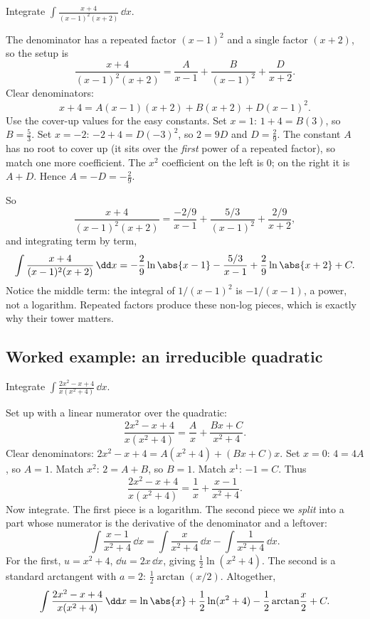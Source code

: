 \begin{example}
\label{ch24:ex-repeated}
Integrate $\displaystyle \int \frac{x + 4}{(x-1)^2(x+2)}\,\dd x.$
\end{example}

The denominator has a repeated factor $(x-1)^2$ and a single factor $(x+2)$,
so the setup is
\[
\frac{x+4}{(x-1)^2(x+2)} = \frac{A}{x-1} + \frac{B}{(x-1)^2} + \frac{D}{x+2}.
\]
Clear denominators:
\[
x + 4 = A(x-1)(x+2) + B(x+2) + D(x-1)^2.
\]
Use the cover-up values for the easy constants. Set $x = 1$: $1 + 4 = B(3)$, so
$B = \tfrac{5}{3}$. Set $x = -2$: $-2 + 4 = D(-3)^2$, so $2 = 9D$ and $D =
\tfrac{2}{9}$. The constant $A$ has no root to cover up (it sits over the
\emph{first} power of a repeated factor), so match one more coefficient. The
$x^2$ coefficient on the left is $0$; on the right it is $A + D$. Hence $A =
-D = -\tfrac{2}{9}$.

So
\[
\frac{x+4}{(x-1)^2(x+2)} = \frac{-2/9}{x-1} + \frac{5/3}{(x-1)^2}
+ \frac{2/9}{x+2},
\]
and integrating term by term,
\[
\int \frac{x+4}{(x-1)^2(x+2)}\,\dd x
= -\frac{2}{9}\ln\abs{x-1} - \frac{5/3}{x-1} + \frac{2}{9}\ln\abs{x+2} + C.
\]
Notice the middle term: the integral of $1/(x-1)^2$ is $-1/(x-1)$, a power, not
a logarithm. Repeated factors produce these non-log pieces, which is exactly
why their tower matters.

\subsection{Worked example: an irreducible quadratic}

\begin{example}
\label{ch24:ex-quadratic}
Integrate $\displaystyle \int \frac{2x^2 - x + 4}{x(x^2+4)}\,\dd x.$
\end{example}

Set up with a linear numerator over the quadratic:
\[
\frac{2x^2 - x + 4}{x(x^2+4)} = \frac{A}{x} + \frac{Bx + C}{x^2 + 4}.
\]
Clear denominators: $2x^2 - x + 4 = A(x^2+4) + (Bx + C)x$. Set $x = 0$:
$4 = 4A$, so $A = 1$. Match $x^2$: $2 = A + B$, so $B = 1$. Match $x^1$:
$-1 = C$. Thus
\[
\frac{2x^2-x+4}{x(x^2+4)} = \frac{1}{x} + \frac{x - 1}{x^2+4}.
\]
Now integrate. The first piece is a logarithm. The second piece we
\emph{split} into a part whose numerator is the derivative of the denominator
and a leftover:
\[
\int \frac{x - 1}{x^2 + 4}\,\dd x
= \int \frac{x}{x^2+4}\,\dd x - \int \frac{1}{x^2+4}\,\dd x.
\]
For the first, $u = x^2 + 4$, $\dd u = 2x\,\dd x$, giving
$\tfrac{1}{2}\ln(x^2+4)$. The second is a standard arctangent with $a = 2$:
$\tfrac{1}{2}\arctan(x/2)$. Altogether,
\[
\int \frac{2x^2-x+4}{x(x^2+4)}\,\dd x
= \ln\abs{x} + \frac{1}{2}\ln(x^2+4) - \frac{1}{2}\arctan\!\frac{x}{2} + C.
\]

